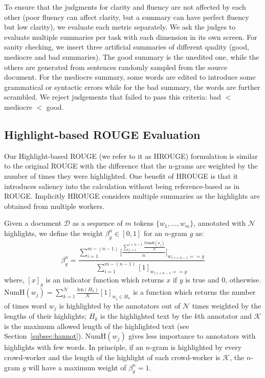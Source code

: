 \documentclass[11pt,a4paper]{article}
\newcommand\hrouge{\textsc{HROUGE}}
\newcommand\rouge{\textsc{ROUGE}}
\begin{document}
To ensure that the judgments for clarity and fluency are not affected by each other (poor fluency can affect clarity, but a summary can have perfect fluency but low clarity), we evaluate each metric separately. We ask the judges to evaluate multiple summaries per task with each dimension in its own screen. For sanity checking, we insert three artificial summaries of different quality (good, mediocre and bad summaries). The good summary is the unedited one, while the others are generated from sentences randomly sampled from the source document. For the mediocre summary, some words are edited to introduce some grammatical or syntactic errors while for the bad summary, the words are further scrambled. We reject judgements that failed to pass this criteria: bad $<$ mediocre $<$ good.

\subsection{Highlight-based ROUGE Evaluation} 
\label{subsec:hrouge}

Our Highlight-based \rouge{} (we refer to it as \hrouge{}) formulation is similar to the original ROUGE with the difference that the n-grams are weighted by the number of times they were highlighted. One benefit of \hrouge{} is that it introduces saliency into the calculation without being reference-based as in \rouge{}. Implicitly \hrouge{} considers multiple summaries as the highlights are obtained from multiple workers. 

Given a document $\mathcal{D}$ as a sequence of $m$ tokens $\{w_1, \ldots, w_m\}$, annotated with $\mathcal{N}$ highlights, we define the weight $\beta_g^n \in [0,1]$ for an $n$-gram $g$ as: 
\begin{equation}
    \beta_g^n = \frac{\displaystyle\sum_{i=1}^{m-(n-1)} \Bigg[\frac{\sum_{j=i}^{i+n-1} \frac{\mathrm{NumH}(w_j)}{\mathcal{N}}}{n}\Bigg]_{w_{i:i+n-1} == g}}{\displaystyle\sum_{i=1}^{m-(n-1)} [1]_{w_{i:i+n-1} == g} }
\end{equation}
\noindent where, $[x]_y$ is an indicator function which returns $x$ if $y$ is true and $0$, otherwise.  $\mathrm{NumH}(w_j) = \sum_{k=1}^{\mathcal{N}} \frac{\mathrm{len}(H_k)}{\mathcal{K}} [1]_{w_j \in H_k}$ is a function which returns the number of times word $w_j$ is highlighted by the annotators out of $\mathcal{N}$ times weighted by the lengths of their highlights; $H_k$ is the highlighted text by the $k$th annotator and  $\mathcal{K}$ is the maximum allowed length of the highlighted text (see Section~\ref{subsec:hannot}). $\mathrm{NumH}(w_j)$ gives less importance to  annotators with highlights with few words. In principle, if an $n$-gram is highlighted by every crowd-worker and the length of the highlight of each crowd-worker is $\mathcal{K}$, the $n$-gram $g$ will have a maximum weight of $\beta_g^n = 1$.
\end{document}
